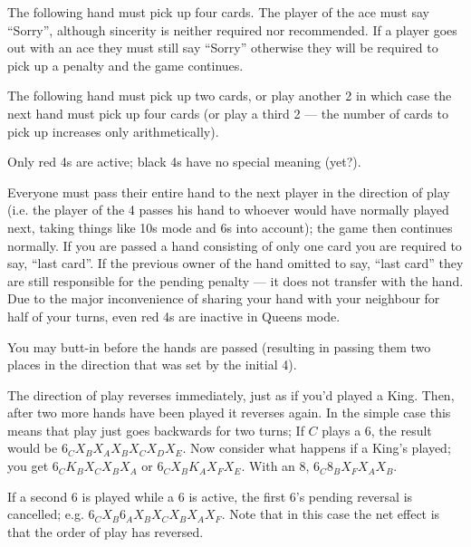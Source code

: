 \documentclass[12pt]{article}
\begin{document}
\begin{description}
\newcommand{\card}[1]{\hbox to 15mm{#1\hfil}}
\item[\card{Ace}] The following hand must pick up four cards.  The player of the ace must say ``Sorry'', although
  sincerity is neither required nor recommended.  If a player goes out with an ace they must still say ``Sorry''
  otherwise they will be required to pick up a penalty and the game continues.

  \item[\card{2}]
    The following hand must pick up two cards, or play another 2 in which case the next hand must
    pick up four cards (or play a third 2 --- the number of cards to pick up increases only arithmetically).

  \item[\card{4}]

    Only red 4s are active;  black 4s have no special meaning (yet?).

    Everyone must pass their entire hand to the next player in the direction of play (i.e. the player of the 4
    passes his hand to whoever would have normally played next, taking things like 10s mode and 6s into
    account); the game then continues normally.  If you are passed a hand consisting of only one card you are
    required to say, ``last card''.  If the previous owner of the hand omitted to say, ``last card'' they are
    still responsible for the pending penalty --- it does not transfer with the hand.  Due to the major
    inconvenience of sharing your hand with your neighbour for half of your turns, even red 4s are inactive in
    Queens mode.

    You may butt-in before the hands are passed (resulting in passing them two places in the direction that
    was set by the initial 4).

  \item[\card{6}]
    The direction of play reverses immediately, just as if you'd played a King.  Then, after two
    more hands have been played it reverses again.  In the simple case this means that play just goes backwards
    for two turns; If $C$ plays
    a 6, the result would be $6_C X_B X_A X_B X_C X_D X_E$.  Now consider what happens if a
    King's played;  you get $6_C K_B X_C X_B X_A$ or $6_C X_B K_A X_F X_E$.  With an 8,
    $6_C 8_B X_F X_A X_B$.

    If a second 6 is played while a 6 is active, the first 6's pending reversal is cancelled; e.g.  $6_C X_B
    6_A X_B X_C X_B X_A X_F$.  Note that in this case the net effect is that the order of play has reversed.


\end{description}
\end{document}
